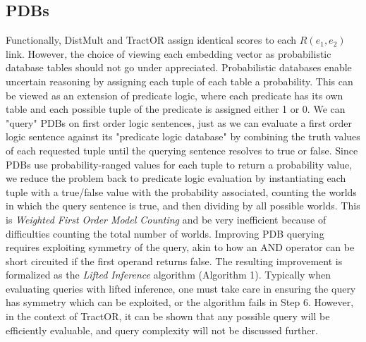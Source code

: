 \documentclass{article}
\begin{document}
\subsection{PDBs}

Functionally, DistMult and TractOR assign identical scores to each \(R(e_1,
e_2)\) link. However, the choice of viewing each embedding vector as
probabilistic database tables should not go under appreciated. Probabilistic
databases enable uncertain reasoning by assigning each tuple of each table a
probability. This can be viewed as an extension of predicate logic, where each
predicate has its own table and each possible tuple of the predicate is assigned
either 1 or 0. We can "query" PDBs on first order logic sentences, just as we
can evaluate a first order logic sentence against its "predicate logic database"
by combining the truth values of each requested tuple until the querying
sentence resolves to true or false. Since PDBs use probability-ranged values for
each tuple to return a probability value, we reduce the problem back to
predicate logic evaluation by instantiating each tuple with a true/false value
with the probability associated, counting the worlds in which the query sentence
is true, and then dividing by all possible worlds. This is \textit{Weighted
First Order Model Counting} and be very inefficient because of difficulties
counting the total number of worlds. Improving PDB querying requires exploiting
symmetry of the query, akin to how an AND operator can be short circuited if the
first operand returns false. The resulting improvement is formalized as the
\textit{Lifted Inference} algorithm (Algorithm 1). Typically when evaluating
queries with lifted inference, one must take care in ensuring the query has
symmetry which can be exploited, or the algorithm fails in Step 6. However, in
the context of TractOR, it can be shown that any possible query will be
efficiently evaluable, and query complexity will not be discussed further.
 
\end{document}
